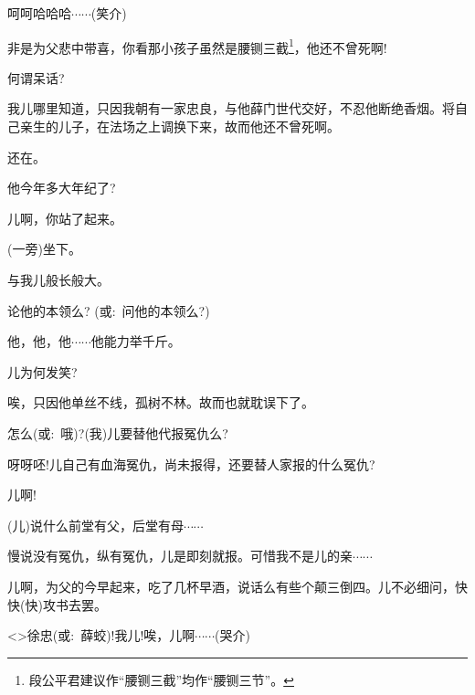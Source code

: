 {呵呵哈哈哈$\cdots{}\cdots{}$({\hwfs 笑介})

非是为父悲中带喜，你看那小孩子虽然是腰铡三截\footnote{段公平{\scriptsize 君}建议作``腰铡三截''均作``腰铡三节''。}，他还不曾死啊!

何谓呆话?

我儿哪里知道，只因我朝有一家忠良，与他薛门世代交好，不忍他断绝香烟。将自己亲生的儿子，在法场之上调换下来，故而他还不曾死啊。

还在。

他今年多大年纪了?

儿啊，你站了起来。

(一旁)坐下。

与我儿般长般大。

论他的本领么? ({\akai 或}:~问他的本领么?)

他，他，他$\cdots{}\cdots{}$他能力举千斤。

儿为何发笑?

唉，只因他单丝不线，孤树不林。故而也就耽误下了。

怎么({\akai 或}:~哦)?(我)儿要替他代报冤仇么?

呀呀呸!儿自己有血海冤仇，尚未报得，还要替人家报的什么冤仇?

儿啊!

(儿)说什么前堂有父，后堂有母$\cdots{}\cdots{}$

慢说没有冤仇，纵有冤仇，儿是即刻就报。可惜我不是儿的亲$\cdots{}\cdots{}$

儿啊，为父的今早起来，吃了几杯早酒，说话么有些个颠三倒四。儿不必细问，快快(快)攻书去罢。


\textless{}\!\textgreater{}徐忠({\akai 或}:~薛蛟)!我儿!唉，儿啊$\cdots{}\cdots{}$({\hwfs 哭介})






}
